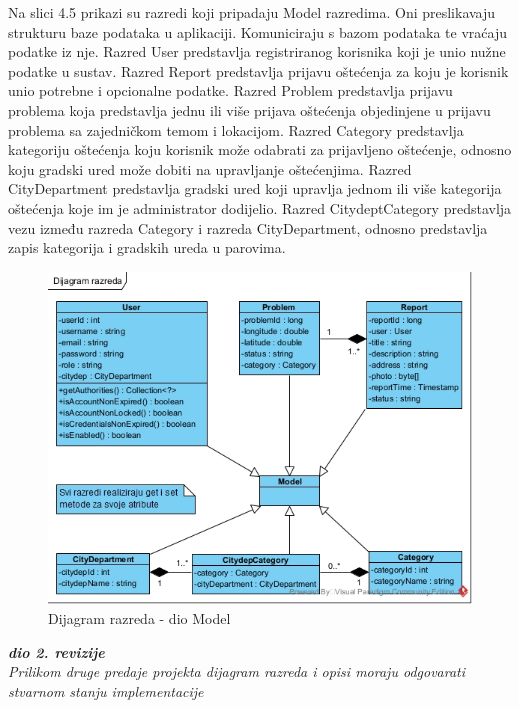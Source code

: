 Na slici 4.5 prikazi su razredi koji pripadaju Model razredima. Oni preslikavaju strukturu baze podataka
u aplikaciji. Komuniciraju s bazom podataka te vraćaju podatke iz nje. Razred User predstavlja registriranog
korisnika koji je unio nužne podatke u sustav. Razred Report predstavlja prijavu oštećenja za koju je korisnik
unio potrebne i opcionalne podatke. Razred Problem predstavlja prijavu problema koja predstavlja jednu ili više
prijava oštećenja objedinjene u prijavu problema sa zajedničkom temom i lokacijom. Razred Category predstavlja 
kategoriju oštećenja koju korisnik može odabrati za prijavljeno oštećenje, odnosno koju gradski ured može dobiti
na upravljanje oštećenjima. Razred CityDepartment predstavlja gradski ured koji upravlja jednom ili više 
kategorija oštećenja koje im je administrator dodijelio. Razred CitydeptCategory predstavlja vezu između
razreda Category i razreda CityDepartment, odnosno predstavlja zapis kategorija i gradskih ureda u parovima.


\begin{figure}[H]
	\includegraphics[scale=0.60]{slike/DR-model.jpg} %
	\centering
	\caption{Dijagram razreda - dio Model}
	\label{fig:DijagramRazredaModel}
\end{figure}


\textbf{\textit{dio 2. revizije}}\\

\textit{Prilikom druge predaje projekta dijagram razreda i opisi moraju odgovarati stvarnom stanju implementacije}



